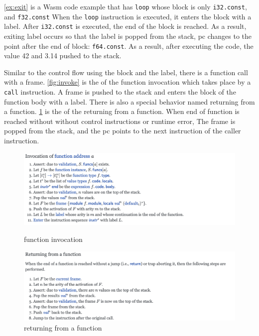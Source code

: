 \cref{ex:exit} is a Wasm code example that has \texttt{loop} whose block is
only \texttt{i32.const}, and \texttt{f32.const}
When the \texttt{loop} instruction is executed, it enters the block with a label.
After \texttt{i32.const} is executed, the end of the block is reached.
As a result, exiting label occurs so that the label is popped from the stack,
pc changes to the point after the end of block: \texttt{f64.const}.
As a result, after executing the code, the value 42 and 3.14 pushed to the
stack.


Similar to the control flow using the block and the label, there is a function
call with a frame.
\cref{fig:invoke} is the \officialp{} of the function invocation which takes
place by a \texttt{call} instruction.
A frame is pushed to the stack and enters the block of the function body with a
label.
There is also a special behavior named returning from a function.
\cref{fig:returning} is the \officialp{} of the returning from a function.
When end of function is reached without without control instructions or runtime
error, The frame is popped from the stack, and the pc points to the next
instruction of the caller instruction.

\begin{figure}[h!]
    \centerline{\includegraphics[width=15cm]{fig/invoke}}
    \caption[Enter the caption title here]{function invocation} \label{fig:invoke}
    \centerline{\includegraphics[width=15cm]{fig/returning}}
    \caption[Enter the caption title here]{returning from a function} \label{fig:returning}
\end{figure}


